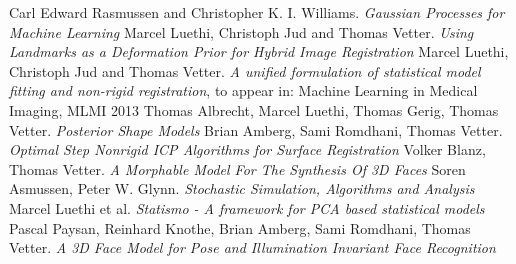 \begin{thebibliography}{9}

 Carl Edward Rasmussen and Christopher K. I. Williams. \emph{Gaussian Processes for Machine Learning}
 Marcel Luethi, Christoph Jud and Thomas Vetter. \emph{Using Landmarks as a Deformation Prior for Hybrid Image Registration}
 Marcel Luethi, Christoph Jud and Thomas Vetter. \emph{A unified formulation of statistical model fitting and non-rigid registration}, to appear in: Machine Learning in Medical Imaging, MLMI 2013
 Thomas Albrecht, Marcel Luethi, Thomas Gerig, Thomas Vetter. \emph{Posterior Shape Models}
 Brian Amberg, Sami Romdhani, Thomas Vetter. \emph{Optimal Step Nonrigid ICP Algorithms for Surface Registration}
 Volker Blanz, Thomas Vetter. \emph{A Morphable Model For The Synthesis Of 3D Faces}
 Soren Asmussen, Peter W. Glynn. \emph{Stochastic Simulation, Algorithms and Analysis}
 Marcel Luethi et al. \emph{Statismo - A framework for PCA based
statistical models}
 Pascal Paysan, Reinhard Knothe, Brian Amberg, Sami Romdhani, Thomas Vetter. \emph{A 3D Face Model for Pose and Illumination Invariant Face
Recognition}

\end{thebibliography}
